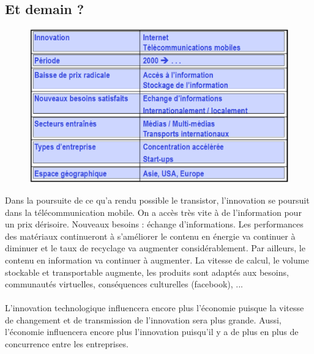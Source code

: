 \subsection{Et demain ?}
\begin{figure}
	\includegraphics[scale=0.35]{63}
\end{figure}
Dans la poursuite de ce qu'a rendu possible le transistor, l'innovation se poursuit dans la télécommunication mobile. On a accès très vite à de l'information pour un prix dérisoire. Nouveaux besoins : échange d'informations. Les performances des matériaux continueront à s’améliorer le contenu en énergie va continuer à diminuer et le taux de recyclage va augmenter considérablement. Par ailleurs, le contenu en information va continuer à augmenter. La vitesse de calcul, le volume stockable et transportable augmente, les produits sont adaptés aux besoins, communautés virtuelles, conséquences culturelles (facebook), ... 
\\\\
L’innovation technologique influencera encore plus
l’économie puisque la vitesse de changement et de transmission de l'innovation sera plus grande. Aussi, l'économie influencera encore plus l'innovation puisqu'il y a de plus en plus de concurrence entre les entreprises. 

